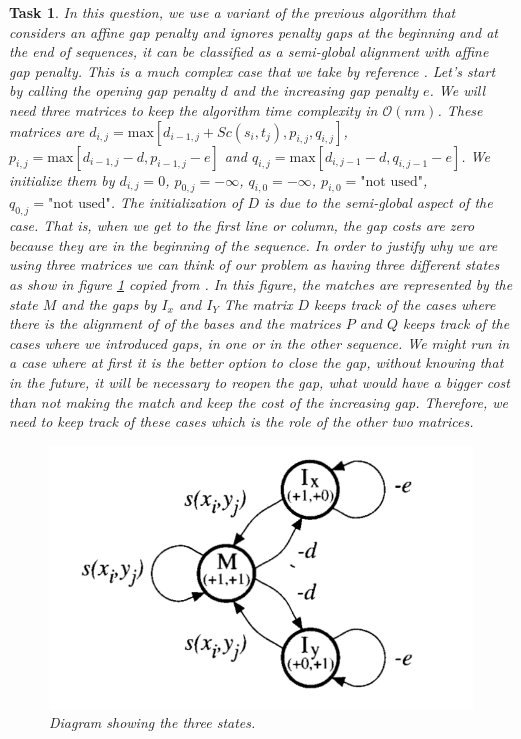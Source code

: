 \documentclass[11pt]{article} %
\theoremstyle{problemstyle}
\newtheorem{exercise}{Task}	%
\renewcommand*{\O}{\mathcal{O}}
\begin{document}
\begin{exercise} %
	\begin{sloppypar}

In this question, we use a variant of the previous algorithm that considers an affine gap penalty and ignores penalty gaps at the beginning and at the end of sequences, it can be classified as a semi-global alignment with affine gap penalty. This is a much complex case that we take by reference \cite{durbin}. Let's start by calling the opening gap penalty $d$ and the increasing gap penalty $e$. We will need three matrices to keep the algorithm time complexity in $\O(nm)$. These matrices are ${d_{i,j}=\text{max}[d_{i-1,j}+Sc(s_i,t_j), p_{i,j}, q_{i,j}]}$, ${p_{i,j}=\text{max}[d_{i-1,j}-d,p_{i-1,j}-e]}$ and ${q_{i,j}=\text{max}[d_{i,j-1}-d,q_{i,j-1}-e]}$. We initialize them by $d_{i,j}=0$, $p_{0,j}=-\infty$, $q_{i,0}=-\infty$, $p_{i,0}=\text{"not used"}$, $q_{0,j}=\text{"not used"}$. The initialization of $D$ is due to the semi-global aspect of the case. That is, when we get to the first line or column, the gap costs are zero because they are in the beginning of the sequence. In order to justify why we are using three matrices we can think of our problem as having three different states as show in figure \ref{fig:automatom} copied from \cite{durbin}. In this figure, the matches are represented by the state $M$ and the gaps by $I_x$ and $I_Y$ The matrix $D$ keeps track of the cases where there is the alignment of of the bases and the matrices $P$ and $Q$ keeps track of the cases where we introduced gaps, in one or in the other sequence. We might run in a case where at first it is the better option to close the gap, without knowing that in the future, it will be necessary to reopen the gap, what would have a bigger cost than not making the match and keep the cost of the increasing gap. Therefore, we need to keep track of these cases which is the role of the other two matrices.

\begin{figure}[h]
	\centerline{\includegraphics[width=0.5\linewidth]{automaton.png}}
	\caption{Diagram showing the three states.}
	\label{fig:automatom}
\end{figure}


\end{sloppypar}
\end{exercise}
\end{document}

